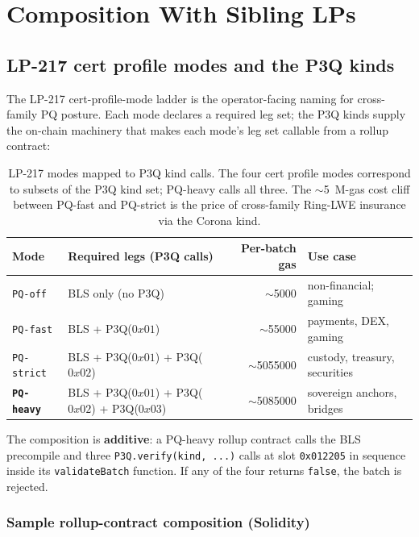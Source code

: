 \section{Composition With Sibling LPs}
\label{sec:composition}

\subsection{LP-217 cert profile modes and the P3Q kinds}

The LP-217 cert-profile-mode ladder is the operator-facing
naming for cross-family PQ posture. Each mode declares a
required leg set; the P3Q kinds supply the on-chain machinery
that makes each mode's leg set callable from a rollup contract:

\begin{table}[h]
\centering
\small
\begin{tabular}{@{}lp{4.5cm}rl@{}}
\toprule
\textbf{Mode} & \textbf{Required legs (P3Q calls)} & \textbf{Per-batch gas} & \textbf{Use case} \\
\midrule
\texttt{PQ-off} & BLS only (no P3Q) & $\sim$\SI{5000}{} & non-financial; gaming \\
\texttt{PQ-fast} & BLS + P3Q($0x01$) & $\sim$\SI{55000}{} & payments, DEX, gaming \\
\texttt{PQ-strict} & BLS + P3Q($0x01$) + P3Q($0x02$) & $\sim$\SI{5055000}{} & custody, treasury, securities \\
\textbf{\texttt{PQ-heavy}} & BLS + P3Q($0x01$) + P3Q($0x02$) + P3Q($0x03$) & $\sim$\SI{5085000}{} & sovereign anchors, bridges \\
\bottomrule
\end{tabular}
\caption{LP-217 modes mapped to P3Q kind calls. The four cert
profile modes correspond to subsets of the P3Q kind set; PQ-heavy
calls all three. The $\sim$\SI{5}{M}-gas cost cliff between
PQ-fast and PQ-strict is the price of cross-family Ring-LWE
insurance via the Corona kind.}
\label{tab:cert-modes-p3q}
\end{table}

The composition is \textbf{additive}: a PQ-heavy rollup contract
calls the BLS precompile and three \texttt{P3Q.verify(kind, ...)}
calls at slot \texttt{0x012205} in sequence inside its
\texttt{validateBatch} function. If any of the four returns
\texttt{false}, the batch is rejected.

\subsubsection{Sample rollup-contract composition (Solidity)}

